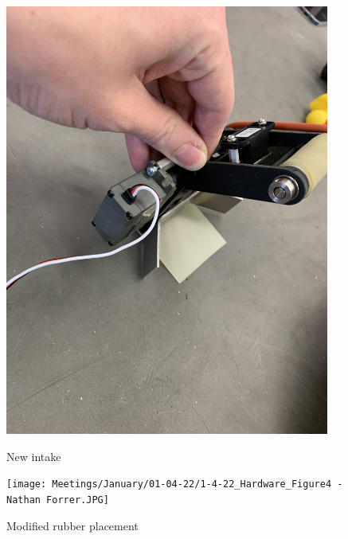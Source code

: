 \begin{figure}[ht]
\centering
\begin{minipage}[b]{.48\textwidth}
  \centering
  \includegraphics[width=0.95\textwidth]{Meetings/January/01-04-22/1-4-22_Hardware_Figure3 - Nathan Forrer.JPG}
  \caption{New intake}
  \label{fig:010422_4}
\end{minipage}%
\hfill%
\begin{minipage}[b]{.48\textwidth}
  \centering
  \texttt{[image: Meetings/January/01-04-22/1-4-22\_Hardware\_Figure4 - Nathan Forrer.JPG]}
  \caption{Modified rubber placement}
  \label{fig:010422_5}
\end{minipage}
\end{figure}


